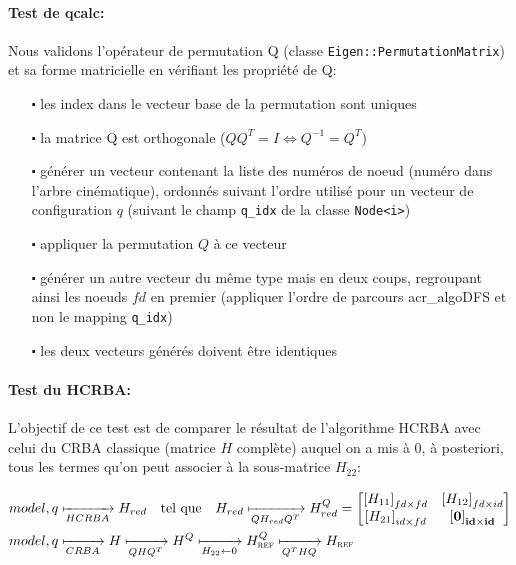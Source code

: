 \documentclass{report}
\begin{document}
\paragraph{Test de qcalc:}
Nous validons l'opérateur de permutation Q (classe \verb;Eigen::PermutationMatrix;) et sa forme matricielle en vérifiant les propriété de Q:
\begin{itemize}
\item[$\centerdot$] les index dans le vecteur base de la permutation sont uniques
\item[$\centerdot$] la matrice Q est orthogonale ($Q Q^T = I \iff Q^{-1} = Q^T$)
\item[$\centerdot$] générer un vecteur contenant la liste des numéros de noeud (numéro dans l'arbre cinématique), ordonnés suivant l'ordre utilisé pour un vecteur de configuration $q$ (suivant le champ \verb;q_idx; de la classe \verb;Node<i>;)
\item[$\centerdot$] appliquer la permutation $Q$ à ce vecteur
\item[$\centerdot$] générer un autre vecteur du même type mais en deux coups, regroupant ainsi les noeuds $fd$ en premier (appliquer l'ordre de parcours \gls{acr_algoDFS} et non le mapping \verb;q_idx;)
\item[$\centerdot$] les deux vecteurs générés doivent être identiques
\end{itemize}


\paragraph{Test du HCRBA:}
L'objectif de ce test est de comparer le résultat de l'algorithme HCRBA avec celui du CRBA classique (matrice $H$ complète) auquel on a mis à 0, à posteriori, tous les termes qu'on peut associer à la sous-matrice $H_{22}$:\vspace{-1cm}
\begin{spacing}{1.5}
\begin{align*}
&model,q \xmapsto[HCRBA]{} 
H_{red} \quad \textnormal{tel que} \quad H_{red} \xmapsto[Q H_{red} Q^T]{} 
H_{red}^Q = 
\begin{bmatrix}
  \left[H_{11}\right]_{fd \times fd} & \left[H_{12}\right]_{fd \times id} \\
  \left[H_{21}\right]_{id \times fd} & \mathbf{\left[0\right]_{id \times id}} \\
\end{bmatrix} \\
&model,q \xmapsto[CRBA]{} H \xmapsto[Q H Q^T]{} H^Q \xmapsto[H_{22} \leftarrow 0]{} H_{\textsc{ref}}^Q \xmapsto[Q^T H Q]{} H_{\textsc{ref}}
\end{align*}
\end{spacing}
\end{document}
